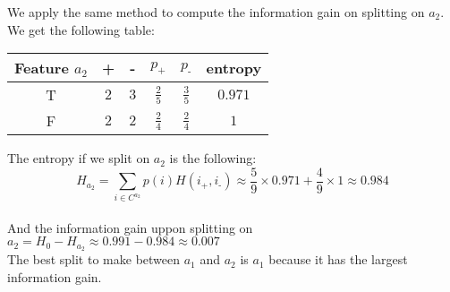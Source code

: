 \documentclass[a4paper, 10pt]{article}
\begin{document}
We apply the same method to compute the information gain on splitting on $a_2$.
\\
We get the following table:
\begin{center}
    \begin{tabular}{ |c|c|c|c|c|c| }
        \hline
        Feature $a_2$ & +      & -     & $p_\text{+}$ & $p_\text{-}$ & entropy\\
        \hline
        T          & $2$    & $3$   & $\frac{2}{5}$ & $\frac{3}{5}$ & $0.971$\\
        \hline
        F          & $2$    & $2$   & $\frac{2}{4}$ & $\frac{2}{4}$ & $1$\\
        \hline
    \end{tabular}
\end{center}
The entropy if we split on $a_2$ is the following:
$$
H_{a_2} = \sum_{i \in C^{a_2}} p(i)H(i_\text{+}, i_\text{-}) \approx \frac{5}{9}\times0.971 + \frac{4}{9}\times1 \approx 0.984
$$
\\
And the information gain uppon splitting on $a_2 = H_0 -H_{a_2} \approx 0.991 -0.984 \approx 0.007$
\\
The best split to make between $a_1$ and $a_2$ is $a_1$ because it has the largest information gain.
\end{document}
